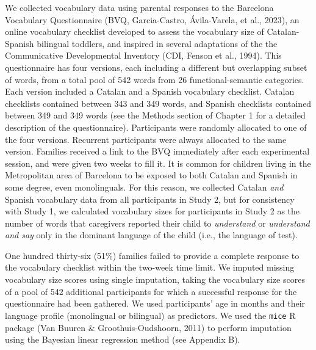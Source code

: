 \documentclass[
  12pt,
  b5paperpaper,
  twoside]{scrreprt}
\begin{document}
We collected vocabulary data using parental responses to the Barcelona
Vocabulary Questionnaire (BVQ, Garcia-Castro, Ávila-Varela, et al.,
2023), an online vocabulary checklist developed to assess the vocabulary
size of Catalan-Spanish bilingual toddlers, and inspired in several
adaptations of the the Communicative Developmental Inventory (CDI,
Fenson et al., 1994). This questionnaire has four versions, each
including a different but overlapping subset of words, from a total pool
of 542 words from 26 functional-semantic categories. Each version
included a Catalan and a Spanish vocabulary checklist. Catalan
checklists contained between 343 and 349 words, and Spanish checklists
contained between 349 and 349 words (see the Methods section of Chapter
1 for a detailed description of the questionnaire). Participants were
randomly allocated to one of the four versions. Recurrent participants
were always allocated to the same version. Families received a link to
the BVQ immediately after each experimental session, and were given two
weeks to fill it. It is common for children living in the Metropolitan
area of Barcelona to be exposed to both Catalan and Spanish in some
degree, even monolinguals. For this reason, we collected Catalan
\emph{and} Spanish vocabulary data from all participants in Study 2, but
for consistency with Study 1, we calculated vocabulary sizes for
participants in Study 2 as the number of words that caregivers reported
their child to \emph{understand} or \emph{understand and say} only in
the dominant language of the child (i.e., the language of test).

One hundred thirty-six (51\%) families failed to provide a complete
response to the vocabulary checklist within the two-week time limit. We
imputed missing vocabulary size scores using single imputation, taking
the vocabulary size scores of a pool of 542 additional participants for
which a successful response for the questionnaire had been gathered. We
used participants' age in months and their language profile (monolingual
or bilingual) as predictors. We used the \texttt{mice} R package (Van
Buuren \& Groothuis-Oudshoorn, 2011) to perform imputation using the
Bayesian linear regression method (see Appendix B).
\end{document}

